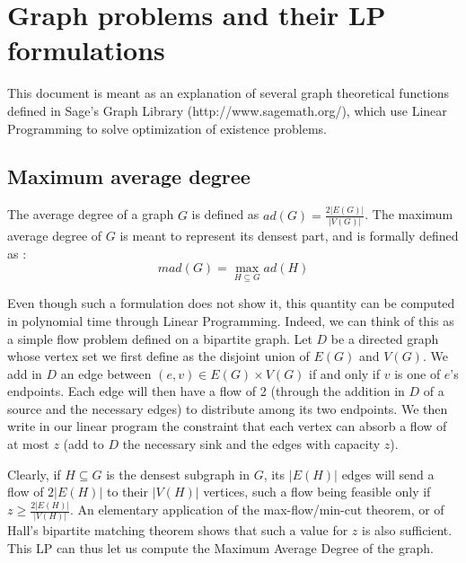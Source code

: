 
\chapter{Graph problems and their LP formulations}

This document is meant as an explanation of several graph theoretical functions defined in Sage's Graph Library (http://www.sagemath.org/), which use Linear Programming to solve optimization of existence problems.



\section{Maximum average degree}
\label{lp:mad}

The average degree of a graph $G$ is defined as $ad(G) = \frac {2|E(G)|}{|V(G)|}$. The maximum average degree of $G$ is meant to represent its densest part, and is formally defined as : $$mad(G) = \max_{H\subseteq G}ad(H)$$

Even though such a formulation does not show it, this quantity can be computed in polynomial time through Linear Programming. Indeed, we can think of this as a simple flow problem defined on a bipartite graph. Let $D$ be a directed graph whose vertex set we first define as the disjoint union of $E(G)$ and $V(G)$. We add in $D$ an edge between $(e,v)\in E(G)\times V(G)$ if and only if $v$ is one of $e$'s endpoints. Each edge will then have a flow of 2 (through the addition in $D$ of a source and the necessary edges) to distribute among its two endpoints. We then write in our linear program the constraint that each vertex can absorb a flow of at most $z$ (add to $D$ the necessary sink and the edges with capacity $z$).

Clearly, if $H\subseteq G$ is the densest subgraph in $G$, its $|E(H)|$ edges will send a flow of $2|E(H)|$ to their $|V(H)|$ vertices, such a flow being feasible only if $z\geq \frac {2|E(H)|}{|V(H)|}$. An elementary application of the max-flow/min-cut theorem, or of Hall's bipartite matching theorem shows that such a value for $z$ is also sufficient. This LP can thus let us compute the Maximum Average Degree of the graph.


